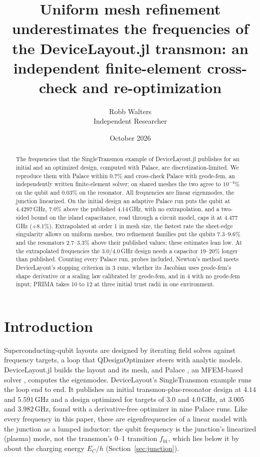 \documentclass{anvil-paper}
\title{Uniform mesh refinement underestimates the frequencies of the
DeviceLayout.jl transmon: an independent finite-element cross-check and
re-optimization}
\author{Robb Walters\\
  {\normalsize Independent Researcher}}
\date{October 2026}
\begin{document}
\maketitle

\begin{abstract}
The frequencies that the SingleTransmon example of DeviceLayout.jl
publishes for an initial and an optimized design, computed with
Palace, are discretization-limited. We reproduce them with Palace
within $0.7\%$ and cross-check Palace with geode-fem, an independently
written finite-element solver; on shared meshes the two agree to
$10^{-4}\%$ on the qubit and $0.03\%$ on the resonator. All
frequencies are linear eigenmodes, the junction linearized. On the
initial design an adaptive Palace run puts the qubit at $4.4297$\,GHz,
$7.0\%$ above the published $4.14$\,GHz, with no extrapolation, and a
two-sided bound on the island capacitance, read through a circuit model,
caps it at $4.477$\,GHz ($+8.1\%$). Extrapolated at order 1 in mesh
size, the fastest rate the sheet-edge singularity allows on uniform meshes,
two refinement families put the qubits $7.3$--$9.6\%$ and the resonators
$2.7$--$3.3\%$ above their published values; these estimates lean low. At
the extrapolated frequencies the $3.0$/$4.0$\,GHz design needs a capacitor
$19$--$20\%$ longer than published. Counting every Palace run, probes
included, Newton's method meets DeviceLayout's stopping criterion in 3
runs, whether its Jacobian uses geode-fem's shape derivative or a scaling
law calibrated by geode-fem, and in 4 with no geode-fem input; PRIMA
takes 10 to 12 at three initial trust radii in one environment.
\end{abstract}

\section{Introduction}
\label{sec:intro}

Superconducting-qubit layouts are designed by iterating field solves
against frequency targets, a loop that QDesignOptimizer
\citep{eriksson2025automated} steers with analytic models. DeviceLayout.jl \citep{devicelayout} builds the layout and
its mesh, and Palace \citep{palace}, an MFEM-based solver \citep{mfem},
computes the eigenmodes. DeviceLayout's SingleTransmon example
\citep{devicelayout-blog,devicelayout-example} runs the loop end to end. It
publishes an initial transmon-plus-resonator design at $4.14$ and
$5.591$\,GHz and a design optimized for targets of $3.0$ and $4.0$\,GHz, at
$3.005$ and $3.982$\,GHz, found with a derivative-free optimizer in nine
Palace runs. Like every frequency in this paper, these are eigenfrequencies
of a linear model with the junction as a lumped inductor: the qubit
frequency is the junction's linearized (plasma) mode, not the transmon's
0--1 transition $f_{01}$, which lies below it by about the charging energy
$E_C/h$ (Section~\ref{sec:junction}).
\end{document}
